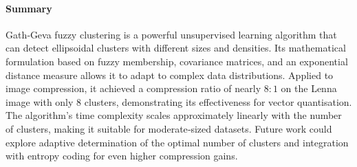 \paragraph{Summary}
Gath‑Geva fuzzy clustering is a powerful unsupervised learning algorithm that can detect ellipsoidal clusters with different sizes and densities. Its mathematical formulation based on fuzzy membership, covariance matrices, and an exponential distance measure allows it to adapt to complex data distributions. Applied to image compression, it achieved a compression ratio of nearly $8:1$ on the Lenna image with only 8 clusters, demonstrating its effectiveness for vector quantisation. The algorithm’s time complexity scales approximately linearly with the number of clusters, making it suitable for moderate‑sized datasets. Future work could explore adaptive determination of the optimal number of clusters and integration with entropy coding for even higher compression gains.
